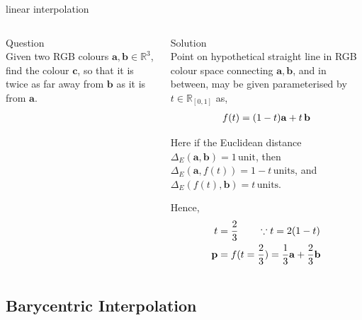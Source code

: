 \documentclass[aspectratio=169,xcolor={dvipsnames,svgnames}]{beamer}
\begin{document}
\begin{frame}[label={sec:org766f1d9}]{linear interpolation}
\begin{columns}
\begin{column}{.3\columnwidth}
\alert{Question} \\[0pt]
Given two RGB colours \(\mathbf{a},\mathbf{b} \in
\mathbb{R}^3\), find the colour \(\mathbf{c}\), so that it
is twice as far away from \(\mathbf{b}\) as it is from
\(\mathbf{a}\).
\end{column}

\begin{column}{.7\columnwidth}
\alert{Solution} \\[0pt]
Point on hypothetical straight line in RGB colour space
connecting \(\mathbf{a},\mathbf{b}\), and in between, may
be given parameterised by \(t\in\mathbb{R}_{[0,1]}\) as,
\begin{align}
  \notag
  f(t) = (1-t)\mathbf{a} + t\,\mathbf{b}
\end{align}

Here if the Euclidean distance \(\Delta_E (\mathbf{a},
\mathbf{b}) = 1\,\mathrm{unit}\), then \(\Delta_E
(\mathbf{a}, f(t)) = 1-t\,\mathrm{units}\), and
\(\Delta_E (f(t), \mathbf{b}) = t\,\mathrm{units}\).

Hence,
\begin{align}
  \notag
  t &= \frac23 \qquad \because t = 2(1-t) \\
  \notag
  \mathbf{p} &= f(t=\frac23) =
               \frac13\mathbf{a} + \frac23\mathbf{b}
\end{align}
\end{column}
\end{columns}
\end{frame}





\subsection{Barycentric Interpolation}
\label{sec:org4aaf7e3}
\end{document}
